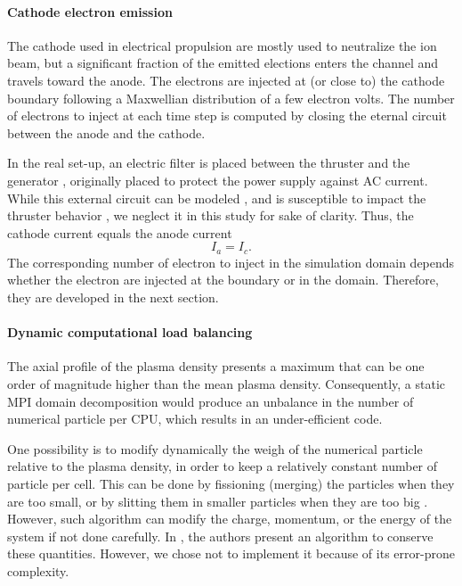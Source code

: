 \paragraph{Cathode electron emission\\}
The cathode used in electrical propulsion are mostly used to neutralize the ion beam, but a significant fraction of the emitted elections enters the channel and travels toward the anode.
The electrons are injected at (or close to) the cathode boundary following a Maxwellian distribution of a few electron volts.
The number of electrons to inject at each time step is computed by closing the eternal circuit between the anode and the cathode.

In the real set-up, an electric filter is placed between the thruster and the generator \citep{barral2008}, originally placed to protect the power supply against AC current.
While this external circuit can be modeled \citep{verboncoeur1993}, and is susceptible to impact the thruster behavior \citep{barral2008,wei2017}, we neglect it in this study for sake of clarity.
Thus, the cathode current equals the anode current \[ I_a = I_c. \]
The corresponding number of electron to inject in the simulation domain depends whether the electron are injected at the boundary or in the domain. 
Therefore, they are developed in the next section.

\paragraph{Dynamic computational load balancing\\}
The axial profile of the plasma density presents a maximum that can be one order of magnitude higher than the mean plasma density.
Consequently, a static MPI domain decomposition would produce an unbalance in the number of numerical particle per CPU, which results in an under-efficient code.

One possibility is to modify dynamically the weigh of the numerical particle relative to the plasma density, in order to keep a relatively constant number of particle per cell.
This can be done by fissioning (merging) the particles when they are too small, or by slitting them in smaller particles when they are too big \citep{shon2001,teunissen2014}.
However, such algorithm can modify the charge, momentum, or the energy of the system if not done carefully.
In \citet{vranic2015}, the authors present an algorithm to  conserve these quantities.
However, we chose not to implement it because of its error-prone complexity.

